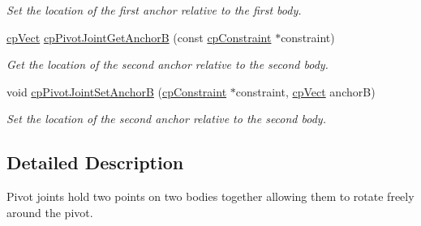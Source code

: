 \begin{DoxyCompactItemize}
\begin{DoxyCompactList}\small\item\em Set the location of the first anchor relative to the first body. \end{DoxyCompactList}\item 
\hypertarget{group__cp_pivot_joint_ga4e5aae1aac5fbb74ba9ddc711bc82b45}{}\hyperlink{structcp_vect}{cp\+Vect} \hyperlink{group__cp_pivot_joint_ga4e5aae1aac5fbb74ba9ddc711bc82b45}{cp\+Pivot\+Joint\+Get\+Anchor\+B} (const \hyperlink{structcp_constraint}{cp\+Constraint} $\ast$constraint)\label{group__cp_pivot_joint_ga4e5aae1aac5fbb74ba9ddc711bc82b45}

\begin{DoxyCompactList}\small\item\em Get the location of the second anchor relative to the second body. \end{DoxyCompactList}\item 
\hypertarget{group__cp_pivot_joint_ga6369e0fa878f0dfba31b3c815f711f96}{}void \hyperlink{group__cp_pivot_joint_ga6369e0fa878f0dfba31b3c815f711f96}{cp\+Pivot\+Joint\+Set\+Anchor\+B} (\hyperlink{structcp_constraint}{cp\+Constraint} $\ast$constraint, \hyperlink{structcp_vect}{cp\+Vect} anchor\+B)\label{group__cp_pivot_joint_ga6369e0fa878f0dfba31b3c815f711f96}

\begin{DoxyCompactList}\small\item\em Set the location of the second anchor relative to the second body. \end{DoxyCompactList}\end{DoxyCompactItemize}


\subsection{Detailed Description}
Pivot joints hold two points on two bodies together allowing them to rotate freely around the pivot. 

